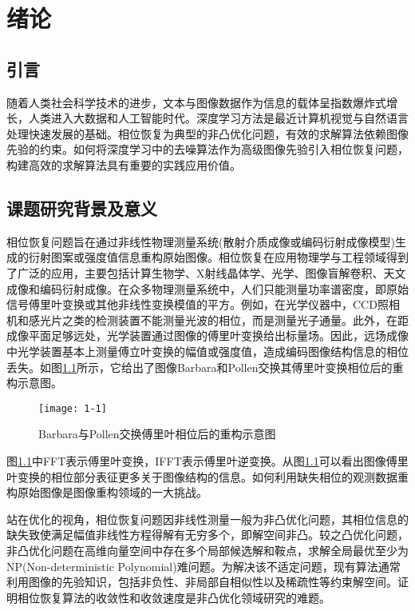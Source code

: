 \chapter{绪\quad 论}
\label{chap:introduction}
\section{引言}
{\normalsize 随着人类社会科学技术的进步，}文本与图像数据作为信息的载体呈指数爆炸式增长，人类进入大数据和人工智能时代。深度学习方法是最近计算机视觉与自然语言处理快速发展的基础。相位恢复为典型的非凸优化问题，有效的求解算法依赖图像先验的约束。如何将深度学习中的去噪算法作为高级图像先验引入相位恢复问题，构建高效的求解算法具有重要的实践应用价值。

\section{课题研究背景及意义}
相位恢复问题旨在通过非线性物理测量系统(散射介质成像或编码衍射成像模型)生成的衍射图案或强度值信息重构原始图像。相位恢复在应用物理学与工程领域得到了广泛的应用，主要包括计算生物学、X射线晶体学、光学、图像盲解卷积、天文成像和编码衍射成像\supercite{Jaganathan,Grohs,Tillmann,Candes,Gross,Baoshun}。在众多物理测量系统中，人们只能测量功率谱密度，即原始信号傅里叶变换或其他非线性变换模值的平方。例如，在光学仪器中，CCD照相机和感光片之类的检测装置不能测量光波的相位，而是测量光子通量。此外，在距成像平面足够远处，光学装置通过图像的傅里叶变换给出标量场\supercite{Metzler0}。因此，远场成像中光学装置基本上测量傅立叶变换的幅值或强度值，造成编码图像结构信息的相位丢失。如图\ref{fig:1-1}所示，它给出了图像Barbara和Pollen交换其傅里叶变换相位后的重构示意图。
\begin{figure}[!htbp]  
	\centering
	\texttt{[image: 1-1]}
	\caption{Barbara与Pollen交换傅里叶相位后的重构示意图}\label{fig:1-1}
\end{figure}

图\ref{fig:1-1}中FFT表示傅里叶变换，IFFT表示傅里叶逆变换。从图\ref{fig:1-1}可以看出图像傅里叶变换的相位部分表征更多关于图像结构的信息。如何利用缺失相位的观测数据重构原始图像是图像重构领域的一大挑战。

站在优化的视角，相位恢复问题因非线性测量一般为非凸优化问题，其相位信息的缺失致使满足幅值非线性方程得解有无穷多个，即解空间非凸。较之凸优化问题，非凸优化问题在高维向量空间中存在多个局部候选解和鞍点，求解全局最优至少为NP(Non-deterministic Polynomial)难问题。为解决该不适定问题，现有算法通常利用图像的先验知识，包括非负性、非局部自相似性以及稀疏性等约束解空间\supercite{LiYin}。证明相位恢复算法的收敛性和收敛速度是非凸优化领域研究的难题\supercite{Hand,Jagatap,Tobias}。

